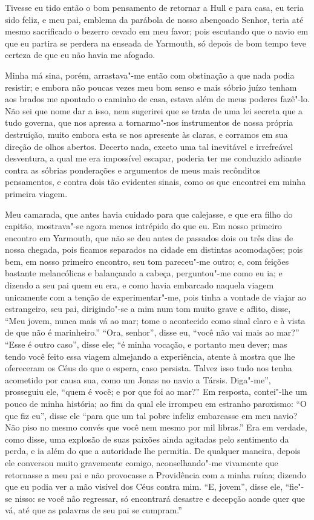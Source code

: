 Tivesse eu tido então o bom pensamento de retornar a Hull e para casa,
eu teria sido feliz, e meu pai, emblema da parábola de nosso abençoado
Senhor, teria até mesmo sacrificado o bezerro cevado em meu favor; pois
escutando que o navio em que eu partira se perdera na enseada de
Yarmouth, só depois de bom tempo teve certeza de que eu não havia me
afogado.

Minha má sina, porém, arrastava"-me então com obstinação a que nada podia
resistir; e embora não poucas vezes meu bom senso e mais sóbrio juízo
tenham aos brados me apontado o caminho de casa, estava além de meus
poderes fazê"-lo. Não sei que nome dar a isso, nem sugerirei que se trata
de uma lei secreta que a tudo governa, que nos apressa a tornarmo"-nos
instrumentos de nossa própria destruição, muito embora esta se nos
apresente às claras, e corramos em sua direção de olhos abertos. Decerto
nada, exceto uma tal inevitável e irrefreável desventura, a qual me era
impossível escapar, poderia ter me conduzido adiante contra as sóbrias
ponderações e argumentos de meus mais recônditos pensamentos, e contra
dois tão evidentes sinais, como os que encontrei em minha primeira
viagem.

Meu camarada, que antes havia cuidado para que calejasse, e que era
filho do capitão, mostrava"-se agora menos intrépido do que eu. Em nosso
primeiro encontro em Yarmouth, que não se deu antes de passados dois ou
três dias de nossa chegada, pois ficamos separados na cidade em
distintas acomodações; pois bem, em nosso primeiro encontro, seu tom
pareceu"-me outro; e, com feições bastante melancólicas e balançando a
cabeça, perguntou"-me como eu ia; e dizendo a seu pai quem eu era, e como
havia embarcado naquela viagem unicamente com a tenção de
experimentar"-me, pois tinha a vontade de viajar ao estrangeiro, seu pai,
dirigindo"-se a mim num tom muito grave e aflito, disse, ``Meu jovem,
nunca mais vá ao mar; tome o acontecido como sinal claro e à vista de
que não é marinheiro.'' ``Ora, senhor'', disse eu, ``você não vai mais
ao mar?'' ``Esse é outro caso'', disse ele; ``é minha vocação, e
portanto meu dever; mas tendo você feito essa viagem almejando a
experiência, atente à mostra que lhe ofereceram os Céus do que o espera,
caso persista. Talvez isso tudo nos tenha acometido por causa sua, como
um Jonas no navio a Társis. Diga"-me'', prosseguiu ele, ``quem é você; e
por que foi ao mar?'' Em resposta, contei"-lhe um pouco de minha
história; ao fim da qual ele irrompeu em estranho paroxismo: ``O que fiz
eu'', disse ele ``para que um tal pobre infeliz embarcasse em meu navio?
Não piso no mesmo convés que você nem mesmo por mil libras.'' Era em
verdade, como disse, uma explosão de suas paixões ainda agitadas pelo
sentimento da perda, e ia além do que a autoridade lhe permitia. De
qualquer maneira, depois ele conversou muito gravemente comigo,
aconselhando"-me vivamente que retornasse a meu pai e não provocasse a
Providência com a minha ruína; dizendo que eu podia ver a mão visível
dos Céus contra mim. ``E, jovem'', disse ele, ``fie"-se nisso: se você
não regressar, só encontrará desastre e decepção aonde quer que vá, até
que as palavras de seu pai se cumpram.''


